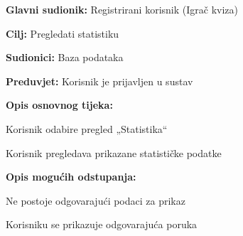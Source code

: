 				
				\noindent {}
				\begin{packed_item}
					
					\item \textbf{Glavni sudionik:} Registrirani korisnik (Igrač kviza)
					\item  \textbf{Cilj:} Pregledati statistiku 
					\item  \textbf{Sudionici:} Baza podataka
					\item  \textbf{Preduvjet:} Korisnik je prijavljen u sustav
					\item  \textbf{Opis osnovnog tijeka:}
					
					\item[] \begin{packed_enum}
						
						\item Korisnik odabire pregled „Statistika“
						\item Korisnik pregledava prikazane statističke podatke
					\end{packed_enum}
					
					\item  \textbf{Opis mogućih odstupanja:}
					
					\item[] \begin{packed_item}
						
						\item[2.a] Ne postoje odgovarajući podaci za prikaz
						\item[] \begin{packed_enum}
							
							\item Korisniku se prikazuje odgovarajuća poruka
							
						\end{packed_enum}
						
					\end{packed_item}
				\end{packed_item}
				
